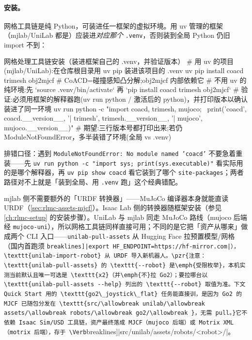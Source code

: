 \paragraph{安装。}网格工具链是纯 Python，可装进任一框架的虚拟环境。用 uv 管理的框架（mjlab/UniLab 都是）应装进\emph{对应那个} \texttt{.venv}，否则装到全局 Python 仍旧 import 不到：

\begin{codebox}[bash]{网格处理工具链安装（装进框架自己的 .venv，并验证版本）}
# 用 uv 的项目(mjlab/UniLab):在仓库根目录用 uv pip 装进该项目的 .venv
uv pip install coacd trimesh obj2mjcf      # CoACD=碰撞感知凸分解;obj2mjcf 内部依赖它
# 不用 uv 的纯环境:先 `source .venv/bin/activate` 再 `pip install coacd trimesh obj2mjcf`
# 验证:必须用框架的解释器跑(uv run python / 激活后的 python)，并打印版本以确认装进了同一环境
uv run python -c "import coacd, trimesh, mujoco; \
print('coacd', coacd.__version__, '| trimesh', trimesh.__version__, '| mujoco', mujoco.__version__)"
# 期望:三行版本号都打印出来;若仍 ModuleNotFoundError，多半装错了环境(全局 vs .venv)
\end{codebox}

排错口径：遇到 \texttt{ModuleNotFoundError: No module named 'coacd'} 不要急着重装——先 \texttt{uv run python -c "import sys; print(sys.\allowbreak executable)"} 看实际用的是哪个解释器，再 \texttt{uv pip show coacd} 看它装到了哪个 \texttt{site-packages}；两者路径对不上就是「装到全局、用 \texttt{.venv} 跑」这个经典错配。

mjlab 侧不需要额外的「URDF 转换器」——MuJoCo 编译器本身就能直读 URDF（\cref{sec:rlmc-assets-mjcf}）。Isaac Lab 侧的转换器随框架安装（参见 \cref{ch:rlmc-setup} 的安装步骤）。UniLab 与 mjlab 同走 MuJoCo 路线（mujoco 后端经 \texttt{mujoco-uni}），所以网格工具链同样直接可用；不同的是它把「资产从哪来」做成两个 CLI 入口——\texttt{unilab-pull-assets} 从 Hugging Face 拉预置模型/网格（国内首跑须 \Verb[breaklines]|export HF_ENDPOINT=https://hf-mirror.com|），\texttt{unilab-import-robot} 从 URDF 导入新机器人。\pzr{注意：\texttt{unilab-pull-assets} 的 \texttt{--robot} 是\emph{受限枚举}，本机实测当前默认且唯一可选是 \texttt{x2}（并\emph{不}拉 Go2）；要拉哪台以 \texttt{unilab-pull-assets --help} 列出的 \texttt{--robot} 取值为准。下文 Quick Start 用的 \texttt{go2\_joystick\_flat} 任务能直接训，是因为 Go2 的 MJCF 已随包分发在 \texttt{src/\allowbreak unilab/\allowbreak assets/\allowbreak robots/\allowbreak go2/\allowbreak }，无需 pull。}它不依赖 Isaac Sim/USD 工具链，资产最终落成 MJCF（mujoco 后端）或 Motrix XML（motrix 后端），存于 \Verb[breaklines]|src/unilab/assets/robots/<robot>/|。

